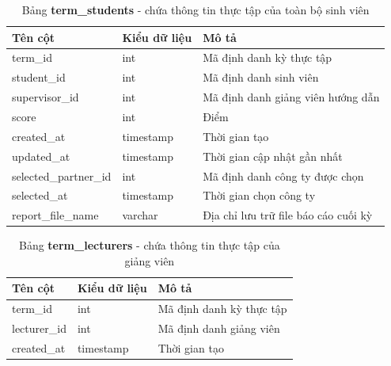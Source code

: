 \documentclass[./../main.tex]{subfiles}
\begin{document}
\begin{table}[H]
	\caption[Bảng term\_students]{Bảng \textbf{term\_students} - chứa thông tin thực tập của toàn bộ sinh viên}
	\label{tab:db_term_students}
	\begin{tabular}{|l|l|l|}
	\hline
	\textbf{Tên cột}      & \textbf{Kiểu dữ liệu} & \textbf{Mô tả}                       \\ \hline
	term\_id              & int                   & Mã định danh kỳ thực tập             \\ \hline
	student\_id           & int                   & Mã định danh sinh viên               \\ \hline
	supervisor\_id        & int                   & Mã định danh giảng viên hướng dẫn    \\ \hline
	score                 & int                   & Điểm                                 \\ \hline
	created\_at           & timestamp             & Thời gian tạo                        \\ \hline
	updated\_at           & timestamp             & Thời gian cập nhật gần nhất          \\ \hline
	selected\_partner\_id & int                   & Mã định danh công ty được chọn       \\ \hline
	selected\_at          & timestamp             & Thời gian chọn công ty               \\ \hline
	report\_file\_name    & varchar               & Địa chỉ lưu trữ file báo cáo cuối kỳ \\ \hline
	\end{tabular}
\end{table}



\begin{table}[H]
	\caption[Bảng term\_lecturers]{Bảng \textbf{term\_lecturers} - chứa thông tin thực tập của giảng viên}
	\label{tab:db_term_lecturers}
	\begin{tabular}{|l|l|l|}
	\hline
	\textbf{Tên cột} & \textbf{Kiểu dữ liệu} & \textbf{Mô tả}           \\ \hline
	term\_id         & int                   & Mã định danh kỳ thực tập \\ \hline
	lecturer\_id     & int                   & Mã định danh giảng viên  \\ \hline
	created\_at      & timestamp             & Thời gian tạo            \\ \hline
	\end{tabular}
\end{table}
\end{document}
